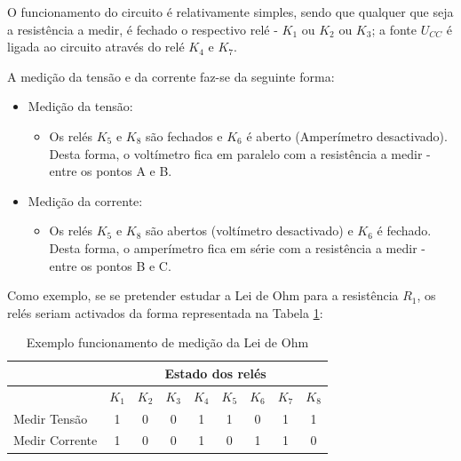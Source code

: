 O funcionamento do circuito é relativamente simples, sendo que qualquer que seja a resistência a medir, é fechado o respectivo relé - $K_{1}$ ou $K_{2}$ ou $K_{3}$; a fonte $U_{CC}$ é ligada ao circuito através do relé $K_{4}$ e $K_{7}$.

A medição da tensão e da corrente faz-se da seguinte forma:
\begin{itemize}
	\item Medição da tensão:
	      \begin{itemize}
		      \item Os relés $K_{5}$ e $K_{8}$ são fechados e $K_{6}$ é aberto (Amperímetro desactivado). Desta forma, o voltímetro fica em paralelo com a resistência a medir - entre os pontos A e B.
	      \end{itemize}
	\item Medição da corrente:
	      \begin{itemize}
		      \item Os relés $K_{5}$ e $K_{8}$ são abertos (voltímetro desactivado) e $K_{6}$ é fechado. Desta forma, o amperímetro fica em série com a resistência a medir - entre os pontos B e C.
	      \end{itemize}
\end{itemize}


Como exemplo, se se pretender estudar a Lei de Ohm para a resistência $R_{1}$, os relés seriam activados da forma representada na Tabela \ref{Table:exemplomedicaoohm}:

\begin{table}[htb]
	\centering
	\caption{Exemplo funcionamento de medição da Lei de Ohm} 
	
	\label{Table:exemplomedicaoohm}
	\begin{tabular}{lcccccccc}
		\toprule
		               & \multicolumn{8}{c}{Estado dos relés}                                                                       \\
		\midrule
		               & $K_{1}$                              & $K_{2}$ & $K_{3}$ & $K_{4}$ & $K_{5}$ & $K_{6}$ & $K_{7}$ & $K_{8}$ \\
		\midrule
		Medir Tensão   & 1                                    & 0       & 0       & 1       & 1       & 0       & 1       & 1       \\
		\midrule
		Medir Corrente & 1                                    & 0       & 0       & 1       & 0       & 1       & 1       & 0       \\
		\bottomrule
	\end{tabular}
\end{table}

